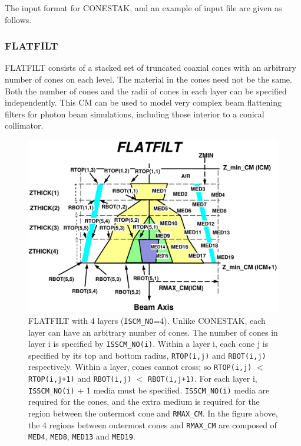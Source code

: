 \documentclass[12pt,twoside]{article}
\begin{document}
The input format for CONESTAK, and an example of input file are given as follows.

\begin{small}

\end{small}

\clearpage

\subsubsection{FLATFILT}
\renewcommand{\rightmark}{FLATFILT CM}

FLATFILT consists of a stacked set of truncated coaxial cones with an arbitrary
number of cones on each level.  The material in the cones need not be the same.
Both the number of cones and the radii of cones in each layer can be specified
independently.  This CM can be used to model very complex beam flattening
filters for photon beam simulations, including those interior to a conical
collimator.
\begin{figure}[h]
\begin{center}
\leavevmode
\mbox{}\hspace{0cm}
\includegraphics[width=16cm]{figures/flatfiltd}
\caption[FLATFILT CM geometry]
{FLATFILT with 4 layers ({\tt ISCM\_NO}=4).  Unlike CONESTAK, each layer can
have an arbitrary number of cones.  The number of cones in layer i is
specified by {\tt ISSCM\_NO(i)}.  Within a layer i, each cone j is specified by
its top and bottom radius, {\tt RTOP(i,j)} and {\tt RBOT(i,j)} respectively.  Within
a layer, cones cannot cross; so {\tt RTOP(i,j)} $<$ {\tt RTOP(i,j+1)} and
{\tt RBOT(i,j)} $<$ {\tt RBOT(i,j+1)}.  For each layer i, {\tt ISSCM\_NO(i)} + 1 media must be
specified.  {\tt ISSCM\_NO(i)} media are required for the cones, and the extra
medium is required for the region between the outermost cone and
{\tt RMAX\_CM}.  In the figure above, the 4 regions between outermost cones and
{\tt RMAX\_CM} are composed of {\tt MED4}, {\tt MED8}, {\tt MED13} and {\tt MED19}.}
\label{fig_FLATFILTD}
\end{center}
\end{figure}
\end{document}
